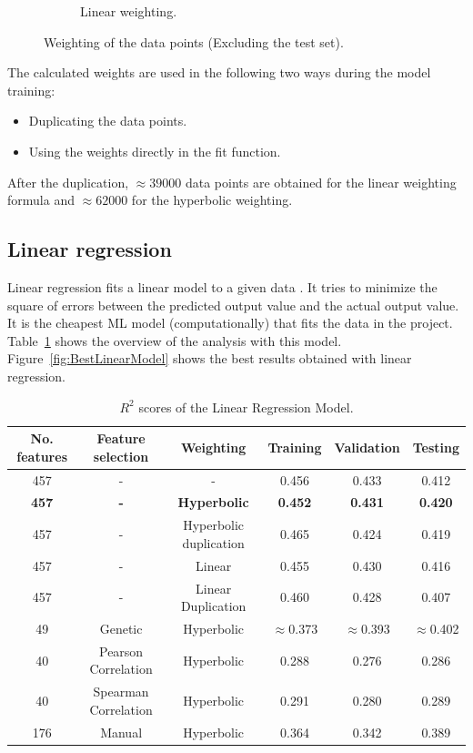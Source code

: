 \documentclass[11pt]{article}
\begin{document}
\begin{figure}
\begin{subfigure}[b]{0.45\textwidth}
        \caption{Linear weighting.}
        \label{fig:linearweightdistribution}
     \end{subfigure}
     \caption{Weighting of the data points (Excluding the test set).}
     \label{fig:WeightDistribution}
\end{figure}

The calculated weights are used in the following two ways during the model training:

\begin{itemize}
\item Duplicating the data points.
\item Using the weights directly in the fit function.
\end{itemize}

After the duplication, $\approx 39000$ data points are obtained for the linear weighting formula and $\approx 62000$ for the hyperbolic weighting.

\subsection{Linear regression}
Linear regression fits a linear model to a given data \cite{linearregressionreview}.
It tries to minimize the square of errors between the predicted output value and the actual output value.
It is the cheapest ML model (computationally) that fits the data in the project.
Table~\ref{table:1} shows the overview of the analysis with this model.
Figure~\ref{fig:BestLinearModel} shows the best results obtained with linear regression.

\begin{table} [h!]
\centering
\resizebox{\linewidth}{!} {
\begin{tabular}{ | c | c | c | c | c | c | }
\hline
\textbf{No.  features} & \textbf{Feature selection} & \textbf{Weighting} & \textbf{Training} & \textbf{Validation} & \textbf{Testing} \\ [0.5 ex]
\hline \hline
457 & - & - & 0.456 & 0.433 & 0.412\\
\textbf{457} &  \textbf{-} & \textbf{Hyperbolic} & \textbf{0.452} & \textbf{0.431} & \textbf{0.420}\\
457 & - & Hyperbolic duplication & 0.465 & 0.424 & 0.419\\
457 & - & Linear & 0.455 & 0.430 & 0.416\\
457 & - & Linear Duplication & 0.460 & 0.428 & 0.407\\
49 & Genetic\footnotemark[1] & Hyperbolic & $\approx$0.373 & $\approx$0.393  & $\approx$0.402\\
40 & Pearson Correlation & Hyperbolic & 0.288 & 0.276  & 0.286 \\ 
40 & Spearman Correlation & Hyperbolic & 0.291 & 0.280  & 0.289 \\ 
176 & Manual & Hyperbolic & 0.364  & 0.342  & 0.389\\ [1ex]
\hline
\end{tabular}
}
\caption{$R^2$ scores of the Linear Regression Model.}
\label {table:1}
\end{table}
\end{document}
